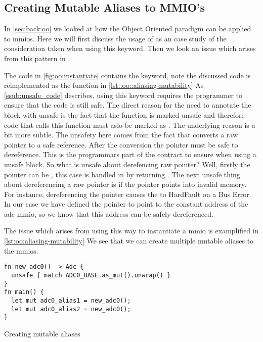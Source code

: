 \subsection{Creating Mutable Aliases to MMIO's}
\label{sec:res:aliasing-mmios}

In \autoref{sec:back:oo} we looked at how the Object Oriented paradigm can be applied to \glspl{mmio}.
Here we will first discuss the usage of {\unsafe} as an case study of the consideration taken when using this keyword.
Then we look an issue which arises from this pattern in {\rust}.

The {\rust} code in \autoref{fig:oo:instantiate} contains the {\unsafe} keyword, note the discussed code is reimplemented as the  function in \autoref{lst::oo::aliasing-mutability}
As \autoref{ssub:unsafe_code} describes, using this keyword requires the programmer to ensure that the code is still safe.
The direct reason for the need to annotate the block with unsafe is the fact that the function  is marked unsafe and therefore code that calls this function must aslo be marked as .
The underlying reason is a bit more subtle.
The unsafety here comes from the fact that  converts a raw pointer to a safe reference.
After the conversion the pointer must be safe to dereference.
This is the programmars part of the contract to ensure when using a unsafe block.
So what is unsafe about derefencing raw pointer?
Well, firstly the pointer can be , this case is handled in  by returning .
The next unsafe thing about dereferencing a raw pointer is if the pointer points into invalid memory.
For instance, dereferencing the pointer   causes the {\gecko} to HardFault on a Bus Error.
In our case we have defined the pointer to point to the constant address of the \gls{adc} \gls{mmio}, so we know that this address can be safely dereferenced.

The issue which arises from using this way to instantiate a \gls{mmio} is examplified in \autoref{lst:oo:aliasing-mutability}
We see that we can create multiple mutable aliases to the \glspl{mmio}.

\begin{listing}[H]
  \begin{verbatim}
fn new_adc0() -> Adc {
  unsafe { match ADC0_BASE.as_mut().unwrap() }
}
fn main() {
  let mut adc0_alias1 = new_adc0();
  let mut adc0_alias2 = new_adc0();
}
  \end{verbatim}
  \caption{Creating mutable aliases}
  \label{lst:oo:aliasing-mutability}
\end{listing}

